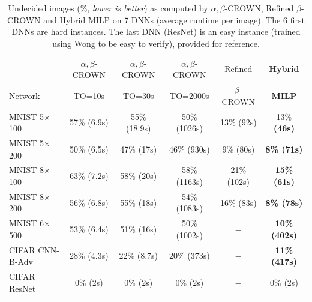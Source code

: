 \begin{table}[t!]
	\centering
	\begin{tabular}{||l||c|c|c||c||c||}
		\hline \hline
		 & $\alpha,\beta$-CROWN & $\alpha,\beta$-CROWN & $\alpha,\beta$-CROWN & Refined & \bf Hybrid \\ 
		 Network & TO=10s & TO=30s & TO=2000s & $\beta$-CROWN & \bf MILP \\ 
		\hline
		MNIST 5$\times$100 & 57\% (6.9s) & 55\% (18.9s) & 50\% (1026s) & 13\% 
		(92s) & 13\% \bf (46s) \\ \hline
		MNIST 5$\times$200 & 50\% (6.5s) & 47\% (17s) & 46\% (930s) & 9\% (80s) & \bf 8\% (71s) \\ \hline
		MNIST 8$\times$100 & 63\% (7.2s) & 58\% (20s) & 58\% (1163s) & 21\% (102s) & \bf 15\% (61s) \\ \hline
		MNIST 8$\times$200 & 56\% (6.8s) & 55\% (18s) & 54\% (1083s) & 16\% (83s) & \bf 8\% (78s) \\ \hline
		MNIST 6$\times$500 & 53\% (6.4s) & 51\% (16s) & 50\% (1002s) & $-$ & 
		\bf 10\% (402s) \\ \hline
		CIFAR CNN-B-Adv & 28\% (4.3s) & 22\% (8.7s) & 20\% (373s) & $-$ & \bf 11\% (417s) \\ \hline \hline
		CIFAR ResNet & 0\% (2s) & 0\% (2s) & 0\% (2s) & $-$ & 0\% (2s) \\ \hline \hline
	\end{tabular}
	\caption{Undecided images ($\%$, {\em lower is better}) as computed by $\alpha,\beta$-CROWN, Refined $\beta$-CROWN and Hybrid MILP on 7 DNNs (average runtime per image). The 6 first DNNs are hard instances. The last DNN (ResNet) is an easy instance (trained using Wong to be easy to verify), provided for reference.
	\vspace{-1cm}}
	\label{table_hybrid}
	\end{table}


